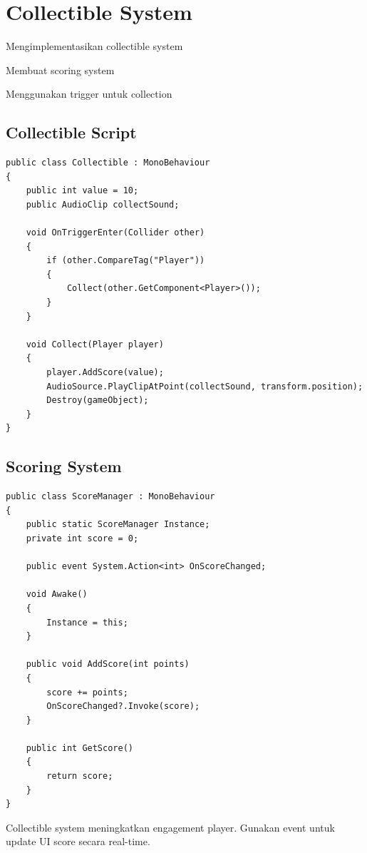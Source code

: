
\section{Collectible System}

\begin{learningoutcomes}
\item Mengimplementasikan collectible system
\item Membuat scoring system
\item Menggunakan trigger untuk collection
\end{learningoutcomes}

\subsection{Collectible Script}

\begin{lstlisting}[language={[Sharp]C}]
public class Collectible : MonoBehaviour
{
    public int value = 10;
    public AudioClip collectSound;
    
    void OnTriggerEnter(Collider other)
    {
        if (other.CompareTag("Player"))
        {
            Collect(other.GetComponent<Player>());
        }
    }
    
    void Collect(Player player)
    {
        player.AddScore(value);
        AudioSource.PlayClipAtPoint(collectSound, transform.position);
        Destroy(gameObject);
    }
}
\end{lstlisting}

\subsection{Scoring System}

\begin{lstlisting}[language={[Sharp]C}]
public class ScoreManager : MonoBehaviour
{
    public static ScoreManager Instance;
    private int score = 0;
    
    public event System.Action<int> OnScoreChanged;
    
    void Awake()
    {
        Instance = this;
    }
    
    public void AddScore(int points)
    {
        score += points;
        OnScoreChanged?.Invoke(score);
    }
    
    public int GetScore()
    {
        return score;
    }
}
\end{lstlisting}

\begin{catatan}
Collectible system meningkatkan engagement player. Gunakan event untuk update UI score secara real-time.
\end{catatan}
